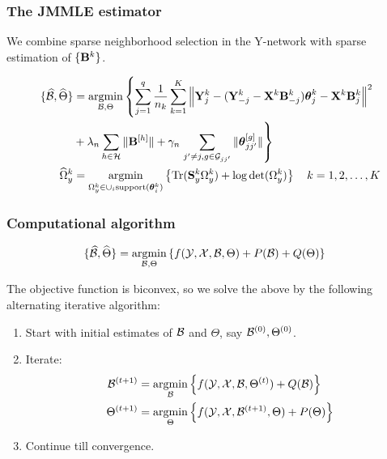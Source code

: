 \documentclass[10pt]{beamer}
\theoremstyle{definition}
\DeclareMathOperator*{\Tr}{Tr}
\DeclareMathOperator*{\argmin}{argmin}
\begin{document}
\begin{frame}
\frametitle{The JMMLE estimator}
We combine sparse neighborhood selection in the Y-network with sparse estimation of $\{ {\mathbf{B}}^k \}$.

\begin{align*}
\{ \widehat \cB, \widehat \Theta \} &=
\argmin_{\cB, \Theta} \left\{ \sum_{j=1}^q \frac{1}{n_k} \sum_{k=1}^K
\left\| \bfY_j^k - ( \bfY_{-j}^k - \bfX^k \bfB_{-j}^k) \bftheta_j^k
- \bfX^k \bfB_j^k \right\|^2 \right.\\
& + \lambda_n \sum_{h \in \cH} \| \bfB^{[h]} \|
+ \gamma_n \left. \sum_{j' \neq j, g \in \cG_{jj'}} \| \bftheta_{jj'}^{[g]} \| \right\}\\
\widehat \Omega_y^k &= \argmin_{\Omega_y^k \in \cup_i \text{support} (\bftheta_i^k)}
\left\{ \Tr (\bfS_y^k \Omega_y^k ) + \log \det (\Omega_y^k ) \right\}
\quad k = 1, 2, \ldots, K
\end{align*}
\end{frame}
\begin{frame}
\frametitle{Computational algorithm}
\begin{align*}
\{ \widehat \cB, \widehat \Theta \} &= \argmin_{\cB, \Theta}
\left\{ f(\cY, \cX, \cB, \Theta) + P(\cB) + Q(\Theta) \right\}
\end{align*}

The objective function is biconvex, so we solve the above by the following alternating iterative algorithm:

\begin{enumerate}
\item Start with initial estimates of ${\cal{B}}$ and $\Theta$, say ${\cal{B}}^{(0)}, \Theta^{(0)}$.
\item Iterate:
%
\begin{align*}
\cB^{(t+1)} &= \argmin_\cB \left\{ f ( \cY, \cX, \cB, \Theta^{(t)}) + Q (\cB) \right\}\\
\Theta^{(t+1)} &= \argmin_\Theta \left\{ f ( \cY, \cX, \cB^{(t+1)}, \Theta) + P (\Theta) \right\}
\end{align*}
\item Continue till convergence.
\end{enumerate}


\end{frame}
\end{document}
